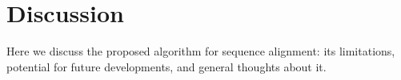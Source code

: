 \chapter*{Discussion} \label{ch:discussion}

Here we discuss the proposed \A algorithm for sequence alignment: its
limitations, potential for future developments, and general thoughts about it.



